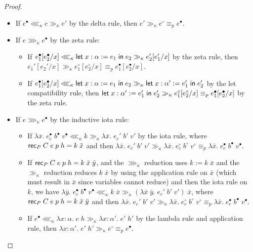 \begin{proof}
\begin{itemize}
\begin{itemize}
\item If $\lift_R\;f^\bullet\;h^\bullet\lll_\kappa\lambda x:\alpha.\;\lift_R\;f\;h\;(\mk_R\;a)\gg_\kappa \lambda x:\alpha'.\;f'\;a'$ by the lambda rule and quotient $\iota$ rule, then $\mk_R\;a\equiv_p x$ and hence this is a quotient in $\P$; in this case $\lift_R\;f\;h$ is a proof, so $\lambda x:\alpha'.\;f'\;a'\gg_\kappa\lambda x:\alpha'.\;f'\;a'\equiv_p\lift_R\;f^\bullet\;h^\bullet$.
\end{itemize}
\item If $e^\bullet\lll_\kappa c\gg_\kappa e'$ by the delta rule, then $e'\gg_\kappa e^\circ\equiv_p e^\bullet$.
\item If $e\ggg_\kappa e^\bullet$ by the zeta rule:
\begin{itemize}
\item If $e_1^\bullet[e_2^\bullet/x]\lll_\kappa\mathsf{let}\;x:\alpha:=e_1\mathrel{\mathsf{in}}e_2\gg_\kappa e_2'[e_1'/x]$ by the zeta rule, then $e_1'[e_2'/x]\gg_\kappa e_1^\circ[e_2^\circ/x]\equiv_p e_1^\bullet[e_2^\bullet/x]$.
\item If $e_1^\bullet[e_2^\bullet/x]\lll_\kappa\mathsf{let}\;x:\alpha:=e_1\mathrel{\mathsf{in}}e_2\gg_\kappa \mathsf{let}\;x:\alpha':=e_1'\mathrel{\mathsf{in}}e_2'$ by the let compatibility rule, then $\mathsf{let}\;x:\alpha':=e_1'\mathrel{\mathsf{in}}e_2'\gg_\kappa e_1^\circ[e_2^\circ/x]\equiv_p e_1^\bullet[e_2^\bullet/x]$ by the zeta rule.
\end{itemize}
\item If $e\ggg_\kappa e^\bullet$ by the inductive iota rule:
\begin{itemize}
\item If $\lambda\bar x.\;e_c^\bullet\;b^\bullet\;v^\bullet\lll_\kappa k\gg_\kappa \lambda\bar x.\;e_c'\;b'\;v'$ by the iota rule, where $\mathsf{rec}_P\;C\;e\;p\;h=k\;\bar x$ and  then $\lambda\bar x.\;e_c'\;b'\;v'\gg_\kappa \lambda\bar x.\;e_c^\circ\;b^\circ\;v^\circ\equiv_p \lambda\bar x.\;e_c^\bullet\;b^\bullet\;v^\bullet$.
\item If $\mathsf{rec}_P\;C\;e\;p\;h=k\;\bar x\;\bar y$, and the $\ggg_\kappa$ reduction uses $k:=k\;\bar x$ and the $\gg_\kappa$ reduction reduces $k\;\bar x$ by using the application rule on $\bar x$ (which must result in $\bar x$ since variables cannot reduce) and then the iota rule on $k$, we have
$\lambda\bar y.\;e_c^\bullet\;b^\bullet\;v^\bullet\lll_\kappa k\;\bar x \gg_\kappa(\lambda\bar x\;\bar y.\;e_c'\;b'\;v')\;\bar x$, where $\mathsf{rec}_P\;C\;e\;p\;h=k\;\bar x\;\bar y$ and  then $\lambda\bar x.\;e_c'\;b'\;v'\gg_\kappa \lambda\bar x.\;e_c^\circ\;b^\circ\;v^\circ\equiv_p \lambda\bar x.\;e_c^\bullet\;b^\bullet\;v^\bullet$.
\item If $e^\bullet\lll_\kappa\lambda x:\alpha.\;e\;h\gg_\kappa \lambda x:\alpha'.\;e'\;h'$ by the lambda rule and application rule, then $\lambda x:\alpha'.\;e'\;h'\gg_\kappa e^\circ\equiv_p e^\bullet$.

\end{itemize}
\end{itemize}
\end{proof}
